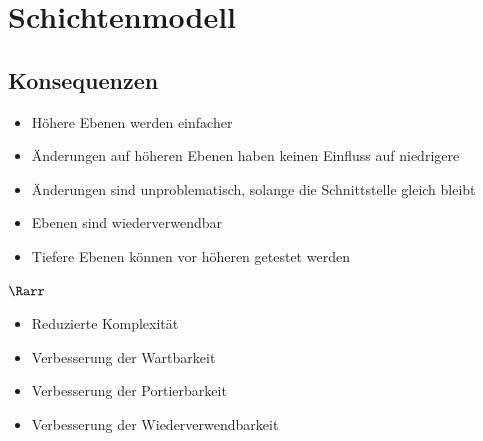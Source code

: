 \section{Schichtenmodell}
\subsection{Konsequenzen}
\begin{itemize}
	\item Höhere Ebenen werden einfacher
	\item Änderungen auf höheren Ebenen haben keinen Einfluss auf niedrigere
	\item Änderungen sind unproblematisch, solange die Schnittstelle gleich bleibt
	\item Ebenen sind wiederverwendbar 
	\item Tiefere Ebenen können vor höheren getestet werden
\end{itemize}
$\Rarr$
\begin{itemize}
	\item Reduzierte Komplexität
	\item Verbesserung der Wartbarkeit 
	\item Verbesserung der Portierbarkeit
	\item Verbesserung der Wiederverwendbarkeit
\end{itemize}
